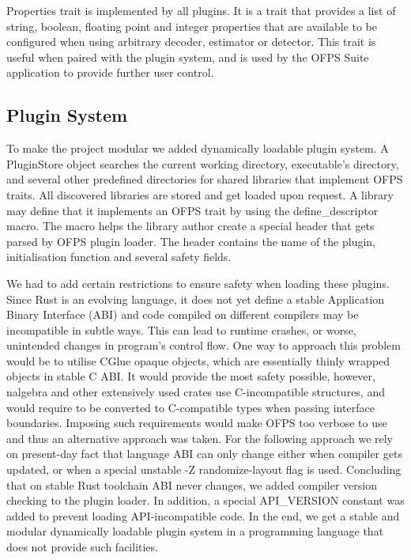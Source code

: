 \documentclass[11pt,english]{report}
\begin{document}
Properties trait is implemented by all plugins. It is a trait that provides a list of string, boolean, floating point and integer properties that are available to be configured when using arbitrary decoder, estimator or detector. This trait is useful when paired with the plugin system, and is used by the OFPS Suite application to provide further user control.

\subsection{Plugin System}

To make the project modular we added dynamically loadable plugin system. A PluginStore object searches the current working directory, executable's directory, and several other predefined directories for shared libraries that implement OFPS traits. All discovered libraries are stored and get loaded upon request. A library may define that it implements an OFPS trait by using the define\_descriptor macro. The macro helps the library author create a special header that gets parsed by OFPS plugin loader. The header contains the name of the plugin, initialisation function and several safety fields.

We had to add certain restrictions to ensure safety when loading these plugins. Since Rust is an evolving language, it does not yet define a stable Application Binary Interface (ABI)\cite{abi-ip} and code compiled on different compilers may be incompatible in subtle ways. This can lead to runtime crashes, or worse, unintended changes in program's control flow. One way to approach this problem would be to utilise CGlue opaque objects\cite{cglue}, which are essentially thinly wrapped objects in stable C ABI. It would provide the most safety possible, however, nalgebra and other extensively used crates use C-incompatible structures, and would require to be converted to C-compatible types when passing interface boundaries. Imposing such requirements would make OFPS too verbose to use and thus an alternative approach was taken. For the following approach we rely on present-day fact that language ABI can only change either when compiler gets updated, or when a special unstable -Z randomize-layout\cite{randomize-layout} flag is used. Concluding that on stable Rust toolchain ABI never changes, we added compiler version checking to the plugin loader. In addition, a special API\_VERSION constant was added to prevent loading API-incompatible code. In the end, we get a stable and modular dynamically loadable plugin system in a programming language that does not provide such facilities.
\end{document}
